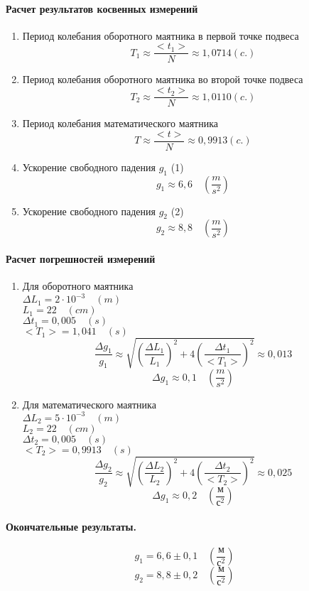 \documentclass{article}
\begin{document}
\paragraph{Расчет результатов косвенных измерений }
\begin{enumerate}
\item Период колебания оборотного маятника в первой точке подвеса
$$T_1\approx\frac{<t_1>}{N}\approx 1{,}0714 (c.) $$
\item Период колебания оборотного маятника во второй точке подвеса
$$T_2\approx\frac{<t_2>}{N}\approx 1{,}0110 (c.) $$
\item Период колебания математического маятника
$$T\approx\frac{<t>}{N}\approx 0{,}9913 (c.) $$
\item Ускорение свободного падения $g_1$ (1)
$$ g_1\approx 6,6\quad\left(\frac{m}{s^2}\right) $$
\item Ускорение свободного падения $g_2$ (2)
$$ g_2\approx 8,8\quad\left(\frac{m}{s^2}\right) $$
\end{enumerate}

\paragraph{Расчет погрешностей измерений }
\begin{enumerate}
	\item Для оборотного маятника\\
	$\Delta L_1 =2\cdot10^{-3} \quad(m)$\\
	$L_1 = 22 \quad(cm)$\\
	$\Delta t_1 = 0,005 \quad(s)$\\
	$ <T_1>= 1,041 \quad(s)$
	$$\frac{\Delta g_1}{g_1}\approx\sqrt{\left(\frac{\Delta L_1}{L_1}\right)^2+4\left(\frac{\Delta t_1}{<T_1>}\right)^2}\approx0,013$$
	$$ \Delta g_1\approx0,1\quad\left(\frac{m}{s^2}\right)$$
		\item Для математического маятника\\
	$\Delta L_2 =5\cdot10^{-3} \quad(m)$\\
	$L_2 = 22 \quad(cm)$\\
	$\Delta t_2 = 0,005 \quad(s)$\\
	$ <T_2>= 0,9913 \quad(s)$
	$$\frac{\Delta g_2}{g_2}\approx\sqrt{\left(\frac{\Delta L_2}{L_2}\right)^2+4\left(\frac{\Delta t_2}{<T_2>}\right)^2}\approx0,025$$
	$$ \Delta g_1\approx0,2 \quad\left(\frac{\mbox{м}}{\mbox{с}^2}\right)$$
\end{enumerate}

\paragraph{Окончательные результаты.}
$$ g_1=6,6\pm0,1\quad\left(\frac{\mbox{м}}{\mbox{с}^2}\right)$$
$$ g_2=8,8\pm0,2\quad\left(\frac{\mbox{м}}{\mbox{с}^2}\right)$$
\end{document}
